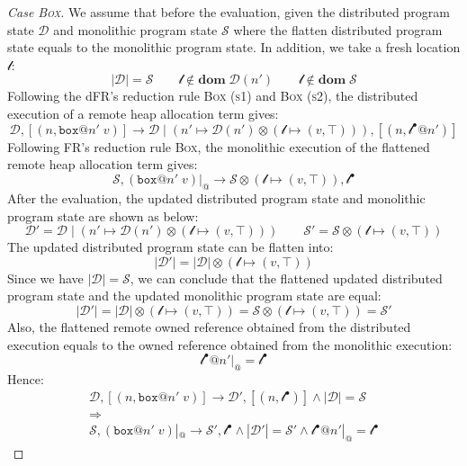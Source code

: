 \begin{proof}[Case \textsc{\emph{Box}}]
We assume that before the evaluation, given the distributed program state $\mathcal{D}$ and monolithic program state $\mathcal{S}$ where the flatten distributed program state equals to the monolithic program state. In addition, we take a fresh location $\mathscr{l}$:
\[
|\mathcal{D}| = \mathcal{S} \quad\quad \mathscr{l} \notin \textbf{dom}\; \mathcal{D}(n') \quad\quad \mathscr{l} \notin \textbf{dom}\; \mathcal{S}
\]
Following the dFR's reduction rule \textsc{Box (s1)} and \textsc{Box (s2)}, the distributed execution of a remote heap allocation term gives:
\[
\mathcal{D}, [(n, \texttt{box}@n'\;v)] \longrightarrow \mathcal{D} \mid (n' \mapsto \mathcal{D}(n')\otimes(\mathscr{l} \mapsto (v, \top))), [(n, \mathscr{l}^\bullet@n')]
\]
Following FR's reduction rule \textsc{Box}, the monolithic execution of the flattened remote heap allocation term gives:
\[
\mathcal{S}, (\texttt{box}@n'\;v)|_@ \longrightarrow \mathcal{S} \otimes (\mathscr{l} \mapsto (v, \top)), \mathscr{l}^\bullet
\]
After the evaluation, the updated distributed program state and monolithic program state are shown as below:
\[
\mathcal{D}' = \mathcal{D} \mid (n' \mapsto \mathcal{D}(n')\otimes(\mathscr{l} \mapsto (v, \top))) \quad\quad 
\mathcal{S}' = \mathcal{S} \otimes (\mathscr{l} \mapsto (v, \top))
\]
The updated distributed program state can be flatten into:
\[|\mathcal{D}'| = |\mathcal{D}| \otimes (\mathscr{l} \mapsto (v, \top))\]
Since we have $|\mathcal{D}| = \mathcal{S}$, we can conclude that the flattened updated distributed program state and the updated monolithic program state are equal:
\[|\mathcal{D}'| = |\mathcal{D}| \otimes (\mathscr{l} \mapsto (v, \top)) = \mathcal{S} \otimes (\mathscr{l} \mapsto (v, \top))= \mathcal{S}'\]
Also, the flattened remote owned reference obtained from the distributed execution equals to the owned reference obtained from the monolithic execution:
\[\mathscr{l}^\bullet@n'|_@ = \mathscr{l}^\bullet\]
Hence:
\begin{gather*}
\mathcal{D}, [(n, \texttt{box}@n'\;v)] \longrightarrow \mathcal{D'}, [(n, \mathscr{l}^\bullet)] \land |\mathcal{D}| = \mathcal{S} \\\Rightarrow\\ \mathcal{S},  (\texttt{box}@n'\;v)|_@ \longrightarrow \mathcal{S'}, \mathscr{l}^\bullet \land |\mathcal{D}'| = \mathcal{S}' \land \mathscr{l}^\bullet@n'|_@ = \mathscr{l}^\bullet
\end{gather*}

\end{proof}
